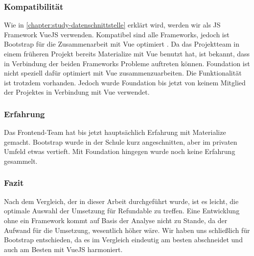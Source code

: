 \subsubsection{Kompatibilität}
\label{chapter:study-frontend-vergleich-kompatibilität}
Wie in \autoref{chapter:study-datenschnittstelle} erklärt wird, werden wir als JS Framework VueJS verwenden. Kompatibel sind alle Frameworks, jedoch ist Bootstrap für die Zusammenarbeit mit Vue optimiert \cite{bootstrap-docu}. Da das Projektteam in einem früheren Projekt bereits Materialize mit Vue benutzt hat, ist bekannt, dass in Verbindung der beiden Frameworks Probleme auftreten können. Foundation ist nicht speziell dafür optimiert mit Vue zusammenzuarbeiten. Die Funktionalität ist trotzdem vorhanden. Jedoch wurde Foundation bis jetzt von keinem Mitglied der Projektes in Verbindung mit Vue verwendet.

\subsubsection{Erfahrung}
\label{chapter:study-frontend-vergleich-erfahrung}
Das Frontend-Team hat bis jetzt hauptsächlich Erfahrung mit Materialize gemacht. Bootstrap wurde in der Schule kurz angeschnitten, aber im privaten Umfeld etwas vertieft. Mit Foundation hingegen wurde noch keine Erfahrung gesammelt.

\subsubsection{Fazit}
\label{chapter:study-frontend-vergleich-fazit}
Nach dem Vergleich, der in dieser Arbeit durchgeführt wurde, ist es leicht, die optimale Auswahl der Umsetzung für Refundable zu treffen. Eine Entwicklung ohne ein Framework kommt auf Basis der Analyse nicht zu Stande, da der Aufwand für die Umsetzung, wesentlich höher wäre. Wir haben uns schließlich für Bootstrap entschieden, da es im Vergleich eindeutig am besten abschneidet und auch am Besten mit VueJS harmoniert.


